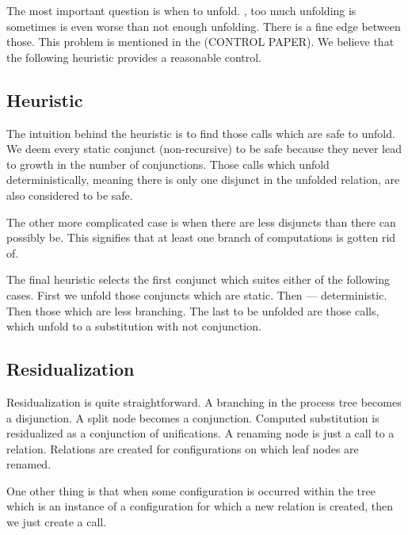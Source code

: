 The most important question is when to unfold.
, too much unfolding is sometimes is even worse than not enough unfolding.
There is a fine edge between those.
This problem is mentioned in the (CONTROL PAPER).
We believe that the following heuristic provides a reasonable control.

\subsection{Heuristic}

The intuition behind the heuristic is to find those calls which are safe to unfold.
We deem every static conjunct (non-recursive) to be safe because they never lead to growth in the number of conjunctions.
Those calls which unfold deterministically, meaning there is only one disjunct in the unfolded relation, are also considered to be safe.

The other more complicated case is when there are less disjuncts than there can possibly be.
This signifies that at least one branch of computations is gotten rid of.

The final heuristic selects the first conjunct which suites either of the following cases.
First we unfold those conjuncts which are static.
Then --- deterministic.
Then those which are less branching.
The last to be unfolded are those calls, which unfold to a substitution with not conjunction.

\subsection{Residualization}

Residualization is quite straightforward.
A branching in the process tree becomes a disjunction.
A split node becomes a conjunction.
Computed substitution is residualized as a conjunction of unifications.
A renaming node is just a call to a relation.
Relations are created for configurations on which leaf nodes are renamed.

One other thing is that when some configuration is occurred within the tree which is an instance of a configuration for which a new relation is created, then we just create a call.
